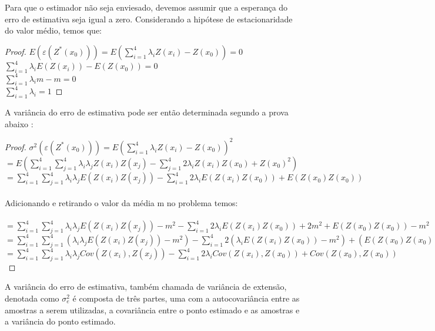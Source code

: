 Para que o estimador não seja enviesado, devemos assumir que a esperança do erro de estimativa seja igual a zero. Considerando a hipótese de estacionaridade do valor médio, temos que: 

\begin{proof}
$E(\varepsilon (Z^{*}(x_{0}))) = E(\sum_{i=1}^{4}\lambda _{i}Z(x_{i}) -Z(x_{0})) = 0 $
\\$\sum_{i=1}^{4}\lambda _{i}E(Z(x_{i})) -E(Z(x_{0})) = 0 $
\\$\sum_{i=1}^{4}\lambda _{i}m -m = 0 $ 
\\$\sum_{i=1}^{4}\lambda _{i} = 1 $  	
\end{proof}

 A variância do erro de estimativa pode ser então determinada segundo a prova abaixo :

\begin{proof}
$\sigma ^2\left (  \varepsilon (Z^{*}(x_{0})) \right )= E\left (\sum_{i=1}^{4}\lambda _{i}Z(x_{i}) -Z(x_{0}) \right )^2$
\\
$= E\left (\sum_{i=1}^{4}\sum_{j=1}^{4}\lambda _{i}\lambda _{j}Z(x_{i})Z(x_{j}) -\sum_{j=1}^{4}2\lambda _{i}Z(x_{i})Z(x_{0}) +Z(x_{0})^2 \right)$
\\
$= \sum_{i=1}^{4}\sum_{j=1}^{4}\lambda _{i}\lambda _{j}E(Z(x_{i})Z(x_{j})) -\sum_{i=1}^{4}2\lambda _{i}E(Z(x_{i})Z(x_{0})) +E(Z(x_{0})Z(x_{0}))$
\\ \\
Adicionando e retirando o valor da média m no problema temos:\\ \\
$= \sum_{i=1}^{4}\sum_{j=1}^{4}\lambda _{i}\lambda _{j}E(Z(x_{i})Z(x_{j}))-m^2 -\sum_{i=1}^{4}2\lambda _{i}E(Z(x_{i})Z(x_{0})) + 2m^2 +E(Z(x_{0})Z(x_{0})) -m^2$
\\
$= \sum_{i=1}^{4}\sum_{j=1}^{4}(\lambda _{i}\lambda _{j}E(Z(x_{i})Z(x_{j}))-m^2) -\sum_{i=1}^{4}2(\lambda _{i}E(Z(x_{i})Z(x_{0})) - m^2) +(E(Z(x_{0})Z(x_{0})) -m^2)$
\\
$= \sum_{i=1}^{4}\sum_{j=1}^{4}\lambda _{i}\lambda _{j}Cov(Z(x_{i}),Z(x_{j}))-\sum_{i=1}^{4}2\lambda _{i}Cov(Z(x_{i}),Z(x_{0}))+Cov(Z(x_{0}),Z(x_{0}))$

\end{proof}

 A variância do erro de estimativa, também chamada de variância de extensão, denotada como $\sigma^{2}_{e}$ é composta de três partes, uma com a autocovariância entre as amostras a serem utilizadas, a covariância entre o ponto estimado e as amostras e a variância do ponto estimado. 

